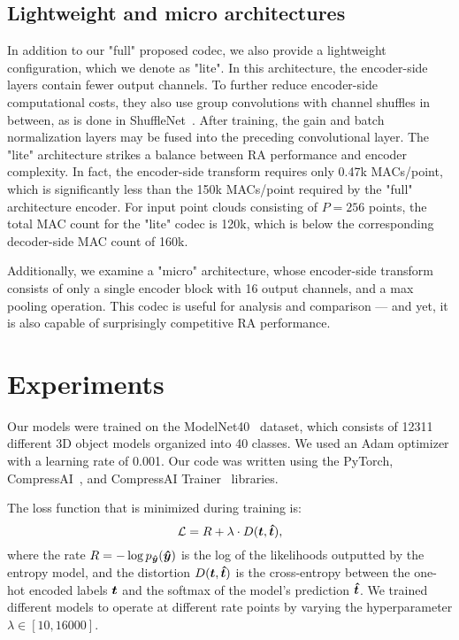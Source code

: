 \subsection{Lightweight and micro architectures}

In addition to our "full" proposed codec, we also provide a lightweight configuration, which we denote as "lite".
In this architecture, the encoder-side layers contain fewer output channels.
To further reduce encoder-side computational costs, they also use group convolutions with channel shuffles in between, as is done in ShuffleNet~\cite{zhang2017shufflenet}.
After training, the gain and batch normalization layers may be fused into the preceding convolutional layer.
The "lite" architecture strikes a balance between RA performance and encoder complexity.
In fact, the encoder-side transform requires only 0.47k MACs/point, which is significantly less than the 150k MACs/point required by the "full" architecture encoder.
For input point clouds consisting of $P=256$ points, the total MAC count for the "lite" codec is 120k, which is below the corresponding decoder-side MAC count of 160k.  %

Additionally, we examine a "micro" architecture, whose encoder-side transform consists of only a single encoder block with 16 output channels, and a max pooling operation.
This codec is useful for analysis and comparison --- and yet, it is also capable of surprisingly competitive RA performance.




\section{Experiments}
\label{sec:experiments}

Our models were trained on the ModelNet40~\cite{wu20143d} dataset, which consists of 12311 different 3D object models organized into 40 classes.
We used an Adam optimizer with a learning rate of 0.001.
Our code was written using the PyTorch, CompressAI~\cite{begaint2020compressai}, and CompressAI Trainer~\cite{ulhaq2022compressaitrainer} libraries.

The loss function that is minimized during training is:
\[
  \mathcal{L} = R + \lambda \cdot D({\boldsymbol{t}}, {\boldsymbol{\hat{t}}}),
\]
%
where the rate $R = -\log p_{{\boldsymbol{\hat{y}}}}({\boldsymbol{\hat{y}}})$ is the log of the likelihoods outputted by the entropy model, and
the distortion $D({\boldsymbol{t}}, {\boldsymbol{\hat{t}}})$ is the cross-entropy between the one-hot encoded labels ${\boldsymbol{t}}$ and the softmax of the model's prediction ${\boldsymbol{\hat{t}}}$.
We trained different models to operate at different rate points by varying the hyperparameter $\lambda \in [10, 16000]$.



